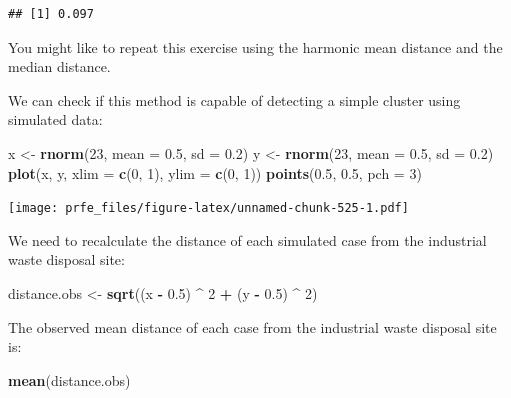 \documentclass[12pt,a4paper]{book}
\newenvironment{Shaded}{\begin{snugshade}}{\end{snugshade}}
\newcommand{\KeywordTok}[1]{\textcolor[rgb]{0.13,0.29,0.53}{\textbf{#1}}}
\newcommand{\DataTypeTok}[1]{\textcolor[rgb]{0.13,0.29,0.53}{#1}}
\newcommand{\DecValTok}[1]{\textcolor[rgb]{0.00,0.00,0.81}{#1}}
\newcommand{\FloatTok}[1]{\textcolor[rgb]{0.00,0.00,0.81}{#1}}
\newcommand{\StringTok}[1]{\textcolor[rgb]{0.31,0.60,0.02}{#1}}
\newcommand{\OperatorTok}[1]{\textcolor[rgb]{0.81,0.36,0.00}{\textbf{#1}}}
\newcommand{\NormalTok}[1]{#1}
\theoremstyle{definition}
\theoremstyle{definition}
\theoremstyle{definition}
\theoremstyle{remark}
\begin{document}
\begin{verbatim}
## [1] 0.097
\end{verbatim}

You might like to repeat this exercise using the harmonic mean distance
and the median distance.

We can check if this method is capable of detecting a simple cluster
using simulated data:

\begin{Shaded}
\begin{Highlighting}[]
\NormalTok{x <-}\StringTok{ }\KeywordTok{rnorm}\NormalTok{(}\DecValTok{23}\NormalTok{, }\DataTypeTok{mean =} \FloatTok{0.5}\NormalTok{, }\DataTypeTok{sd =} \FloatTok{0.2}\NormalTok{)}
\NormalTok{y <-}\StringTok{ }\KeywordTok{rnorm}\NormalTok{(}\DecValTok{23}\NormalTok{, }\DataTypeTok{mean =} \FloatTok{0.5}\NormalTok{, }\DataTypeTok{sd =} \FloatTok{0.2}\NormalTok{)}
\KeywordTok{plot}\NormalTok{(x, y, }\DataTypeTok{xlim =} \KeywordTok{c}\NormalTok{(}\DecValTok{0}\NormalTok{, }\DecValTok{1}\NormalTok{), }\DataTypeTok{ylim =} \KeywordTok{c}\NormalTok{(}\DecValTok{0}\NormalTok{, }\DecValTok{1}\NormalTok{))}
\KeywordTok{points}\NormalTok{(}\FloatTok{0.5}\NormalTok{, }\FloatTok{0.5}\NormalTok{, }\DataTypeTok{pch =} \DecValTok{3}\NormalTok{)}
\end{Highlighting}
\end{Shaded}

\texttt{[image: prfe\_files/figure-latex/unnamed-chunk-525-1.pdf]}

We need to recalculate the distance of each simulated case from the
industrial waste disposal site:

\begin{Shaded}
\begin{Highlighting}[]
\NormalTok{distance.obs <-}\StringTok{ }\KeywordTok{sqrt}\NormalTok{((x }\OperatorTok{-}\StringTok{ }\FloatTok{0.5}\NormalTok{) }\OperatorTok{^}\StringTok{ }\DecValTok{2} \OperatorTok{+}\StringTok{ }\NormalTok{(y }\OperatorTok{-}\StringTok{ }\FloatTok{0.5}\NormalTok{) }\OperatorTok{^}\StringTok{ }\DecValTok{2}\NormalTok{)}
\end{Highlighting}
\end{Shaded}

The observed mean distance of each case from the industrial waste
disposal site is:

\begin{Shaded}
\begin{Highlighting}[]
\KeywordTok{mean}\NormalTok{(distance.obs)}
\end{Highlighting}
\end{Shaded}
\end{document}
